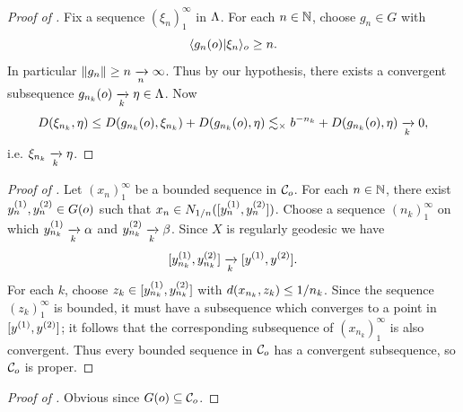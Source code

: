 \begin{proof}[Proof of  \implies {}]
Fix a sequence $(\xi_n)_1^\infty$ in $\Lambda$. For each $n\in\N$, choose $g_n\in G$ with
\[
\langle g_n(o)|\xi_n\rangle_o \geq n.
\]
In particular $\|g_n\|\geq n\xrightarrow[n]{} \infty$. Thus by our hypothesis, there exists a convergent subsequence $g_{n_k}(o)\xrightarrow[k]{}\eta\in\Lambda$. Now
\[
D(\xi_{n_k},\eta) \leq D(g_{n_k}(o),\xi_{n_k}) + D(g_{n_k}(o),\eta)
\lesssim_\times b^{-n_k} + D(g_{n_k}(o),\eta) \xrightarrow[k]{} 0,
\] 
i.e. $\xi_{n_k}\xrightarrow[k]{}\eta$.
\end{proof}
\begin{proof}[Proof of  \implies {}]
Let $(x_n)_1^\infty$ be a bounded sequence in $\mathcal C_o$. For each $n\in\N$, there exist $y_n^{(1)},y_n^{(2)}\in G(o)$ such that $x_n\in N_{1/n}([y_n^{(1)},y_n^{(2)}])$. Choose a sequence $(n_k)_1^\infty$ on which $y_{n_k}^{(1)}\xrightarrow[k]{}\alpha$ and $y_{n_k}^{(2)}\xrightarrow[k]{}\beta$. Since $X$ is regularly geodesic we have
\[
[y_{n_k}^{(1)},y_{n_k}^{(2)}]\xrightarrow[k]{}[y^{(1)},y^{(2)}].
\]
For each $k$, choose $z_k\in [y_{n_k}^{(1)},y_{n_k}^{(2)}]$ with $d(x_{n_k},z_k)\leq 1/n_k$. Since the sequence $(z_k)_1^\infty$ is bounded, it must have a subsequence which converges to a point in $[y^{(1)},y^{(2)}]$; it follows that the corresponding subsequence of $(x_{n_k})_1^\infty$ is also convergent. Thus every bounded sequence in $\mathcal C_o$ has a convergent subsequence, so $\mathcal C_o$ is proper.
\end{proof}
\begin{proof}[Proof of  \implies {}]
Obvious since $G(o)\subseteq\mathcal C_o$.
\end{proof}
